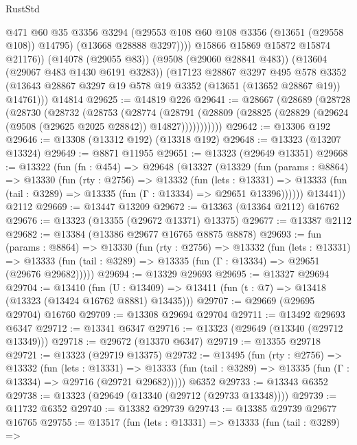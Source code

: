 \begin{lexlean}{RustStd}
\begin{coremodule}
                @471
                @60
                @35
                @3356
                @3294
                (@29553 @108 @60 @108 @3356 (@13651 (@29558 @108)) @14795)
                (@13668 @28888 @3297))))
          @15866
          @15869
          @15872
          @15874
          @21176))
      (@14078 (@29055 @83))
      (@9508 (@29060 @28841 @483))
      (@13604 (@29067 @483 @1430 @6191 @3283))
      (@17123
        @28867
        @3297
        @495
        @578
        @3352
        (@13643 @28867 @3297 @19 @578 @19 @3352 (@13651 (@13652 @28867 @19)) @14761)))
    @14814
@29625 := @14819 @226
@29641 := @28667
    (@28689
      (@28728
        (@28730
          (@28732
            (@28753
              (@28774
                (@28791
                  (@28809 (@28825 (@28829 (@29624 (@9508 (@29625 @2025 @28842)) @14827)))))))))))
@29642 := @13306 @192
@29646 := @13308 (@13312 @192) (@13318 @192)
@29648 := @13323 (@13207 @13324)
@29649 := @8871 @11955
@29651 := @13323 (@29649 @13351)
@29668 := @13322
    (fun (fn : @454) =>
    @29648
      (@13327
        (@13329
          (fun (params : @8864) =>
          @13330
            (fun (rty : @2756) =>
            @13332
              (fun (lets : @13331) =>
              @13333 (fun (tail : @3289) => @13335 (fun (Γ : @13334) => @29651 @13396))))))
        @13441))
    @2112
@29669 := @13447 @13209
@29672 := @13363 (@13364 @2112) @16762
@29676 := @13323 (@13355 (@29672 @13371) @13375)
@29677 := @13387 @2112
@29682 := @13384 (@13386 @29677 @16765 @8875 @8878)
@29693 := fun (params : @8864) =>
  @13330
    (fun (rty : @2756) =>
    @13332
      (fun (lets : @13331) =>
      @13333 (fun (tail : @3289) => @13335 (fun (Γ : @13334) => @29651 (@29676 @29682)))))
@29694 := @13329 @29693
@29695 := @13327 @29694
@29704 := @13410
    (fun (U : @13409) => @13411 (fun (t : @7) => @13418 (@13323 (@13424 @16762 @8881) @13435)))
@29707 := @29669 (@29695 @29704) @16760
@29709 := @13308 @29694 @29704
@29711 := @13492 @29693 @6347
@29712 := @13341 @6347
@29716 := @13323 (@29649 (@13340 (@29712 @13349)))
@29718 := @29672 (@13370 @6347)
@29719 := @13355 @29718
@29721 := @13323 (@29719 @13375)
@29732 := @13495
    (fun (rty : @2756) =>
    @13332
      (fun (lets : @13331) =>
      @13333 (fun (tail : @3289) => @13335 (fun (Γ : @13334) => @29716 (@29721 @29682)))))
    @6352
@29733 := @13343 @6352
@29738 := @13323 (@29649 (@13340 (@29712 (@29733 @13348))))
@29739 := @11732 @6352
@29740 := @13382 @29739
@29743 := @13385 @29739 @29677 @16765
@29755 := @13517
    (fun (lets : @13331) =>
    @13333
      (fun (tail : @3289) =>

\end{coremodule}
\end{lexlean}

